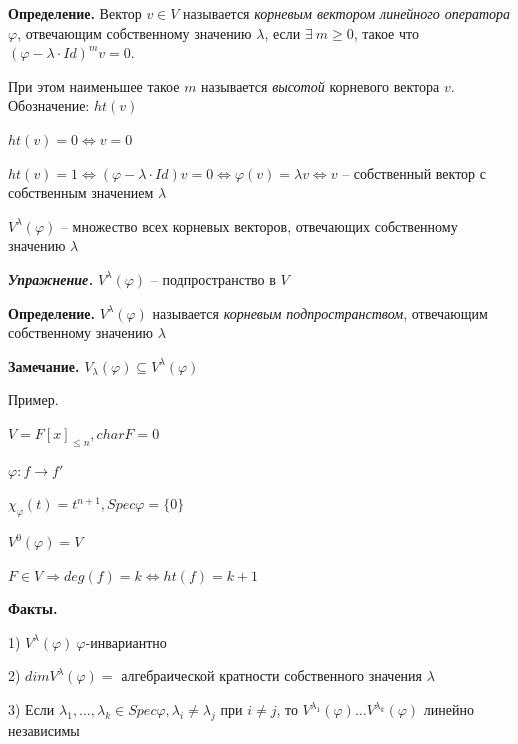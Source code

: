 \vspace{\baselineskip}
\textbf{Определение.} Вектор $v \in V$ называется \textit{корневым вектором линейного оператора} $\varphi$, отвечающим собственному значению $\lambda$, если $\exists \ m \geqslant 0$, такое что $(\varphi - \lambda \cdot Id)^m v = 0$.

При этом наименьшее такое $m$ называется \textit{высотой} корневого вектора $v$. Обозначение: $ht(v)$

\vspace{\baselineskip}
$ht(v) = 0 \Leftrightarrow v = 0$

$ht(v) = 1 \Leftrightarrow (\varphi - \lambda \cdot Id) v = 0 \Leftrightarrow \varphi(v) = \lambda v \Leftrightarrow v$ -- собственный вектор с собственным значением $\lambda$

\vspace{\baselineskip}
$V^{\lambda} (\varphi)$ -- множество всех корневых векторов, отвечающих собственному значению $\lambda$

\vspace{\baselineskip}
\textbf{\textit{Упражнение.}} $V^{\lambda} (\varphi)$ -- подпространство в $V$

\vspace{\baselineskip}
\textbf{Определение.} $V^{\lambda} (\varphi)$ называется \textit{корневым подпространством}, отвечающим собственному значению $\lambda$

\vspace{\baselineskip}
\textbf{Замечание.} $V_{\lambda} (\varphi) \subseteq V^{\lambda} (\varphi)$

\vspace{\baselineskip}
Пример.

$V = F[x]_{\leqslant n}, char F = 0$

$\varphi: f \rightarrow f'$

$\chi_{\varphi}(t) = t^{n+1}, Spec \varphi = \{0\}$

$V^0 (\varphi) = V$

$F \in V \Rightarrow deg(f) = k \Leftrightarrow ht(f) = k + 1$

\vspace{\baselineskip}
\textbf{Факты.}

1) $V^{\lambda} (\varphi) \ \varphi$-инвариантно

2) $dim V^{\lambda} (\varphi) = $ алгебраической кратности собственного значения $\lambda$

3) Если $\lambda_1, \dots, \lambda_k \in Spec \varphi, \lambda_i \neq \lambda_j$ при $i \neq j$, то $V^{\lambda_1} (\varphi) \dots V^{\lambda_k} (\varphi)$ линейно независимы

